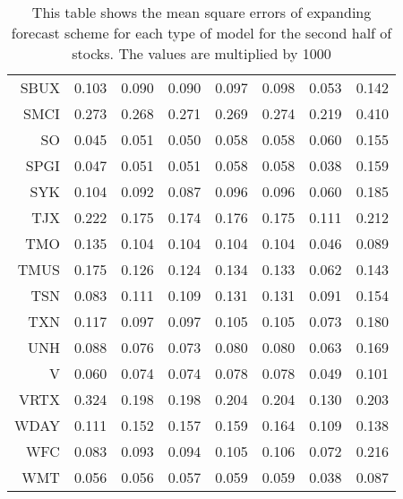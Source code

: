 \begin{table}[ht]
\begin{tabular}{rrrrrrrr}
  SBUX & 0.103 & 0.090 & 0.090 & 0.097 & 0.098 & 0.053 & 0.142 \\ 
  SMCI & 0.273 & 0.268 & 0.271 & 0.269 & 0.274 & 0.219 & 0.410 \\ 
  SO & 0.045 & 0.051 & 0.050 & 0.058 & 0.058 & 0.060 & 0.155 \\ 
  SPGI & 0.047 & 0.051 & 0.051 & 0.058 & 0.058 & 0.038 & 0.159 \\ 
  SYK & 0.104 & 0.092 & 0.087 & 0.096 & 0.096 & 0.060 & 0.185 \\ 
  TJX & 0.222 & 0.175 & 0.174 & 0.176 & 0.175 & 0.111 & 0.212 \\ 
  TMO & 0.135 & 0.104 & 0.104 & 0.104 & 0.104 & 0.046 & 0.089 \\ 
  TMUS & 0.175 & 0.126 & 0.124 & 0.134 & 0.133 & 0.062 & 0.143 \\ 
  TSN & 0.083 & 0.111 & 0.109 & 0.131 & 0.131 & 0.091 & 0.154 \\ 
  TXN & 0.117 & 0.097 & 0.097 & 0.105 & 0.105 & 0.073 & 0.180 \\ 
  UNH & 0.088 & 0.076 & 0.073 & 0.080 & 0.080 & 0.063 & 0.169 \\ 
  V & 0.060 & 0.074 & 0.074 & 0.078 & 0.078 & 0.049 & 0.101 \\ 
  VRTX & 0.324 & 0.198 & 0.198 & 0.204 & 0.204 & 0.130 & 0.203 \\ 
  WDAY & 0.111 & 0.152 & 0.157 & 0.159 & 0.164 & 0.109 & 0.138 \\ 
  WFC & 0.083 & 0.093 & 0.094 & 0.105 & 0.106 & 0.072 & 0.216 \\ 
  WMT & 0.056 & 0.056 & 0.057 & 0.059 & 0.059 & 0.038 & 0.087 \\ 
   \hline
\end{tabular}
\caption[MSE expanding forecast (2)]{This table shows the mean square errors of expanding forecast scheme for each type of model for the second half of stocks. 
                     The values are multiplied by 1000} 
\label{Table:MSE_e_2}
\end{table}

